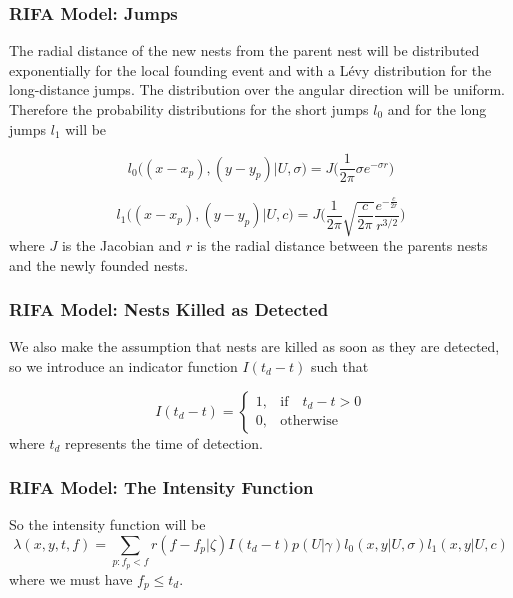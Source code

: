 \documentclass[9pt, xcolor={dvipsnames,svgnames,table}]{beamer}
\begin{document}
\begin{frame}
\frametitle{RIFA Model: Jumps}
    The radial distance of the new nests from the parent nest will be \textcolor{PineGreen}{distributed exponentially for the local founding event} and with a \textcolor{PineGreen}{L\'evy distribution for the long-distance jumps}. \textcolor{PineGreen}{The distribution over the angular direction will be uniform}.
    Therefore the probability distributions for the short jumps $l_0$ and for the long jumps $l_1$ will be

    \begin{equation*}
        l_0\Big((x - x_p), (y - y_p) | U, \sigma \Big)= J \bigg(\frac{1}{2 \pi} \sigma e^{- \sigma r}\bigg)
    \end{equation*}

    \begin{equation*}
        l_1\Big((x - x_p), (y - y_p) | U, c \Big)= J \bigg(\frac{1}{2 \pi} \sqrt{\frac{c}{2 \pi}} \frac{e^{- \frac{c}{ 2 r}}}{r^{3/2}}\bigg)
    \end{equation*}
    where $J$ is the Jacobian and $r$ is the radial distance between the parents nests and the newly founded nests.
\end{frame}




\begin{frame}
    \frametitle{RIFA Model: Nests Killed as Detected}
    We also make the assumption that \textcolor{PineGreen}{nests are killed as soon as they are detected}, so we introduce an indicator function $I(t_d - t)$ such that

    \begin{equation*}
        I (t_d - t) =
        \begin{cases}
            1, & \mbox{if} \quad t_d -  t> 0 \\
            0, & \mbox{otherwise}
        \end{cases}
    \end{equation*}
    where $t_d$ represents the time of detection. 
\end{frame}
    
    
    
    
 \begin{frame}
    \frametitle{RIFA Model: The Intensity Function}
    So \textcolor{PineGreen}{the intensity function will be}
    \begin{equation*}
        \lambda(x, y, t, f) = \sum_{p:f_p < f} r(f - f_p | \zeta) I(t_d - t) p(U | \gamma) l_0(x, y | U, \sigma) l_1(x, y | U, c)
    \end{equation*}
    where we must have $f_p\leq t_d$.
\end{frame}
\end{document}
